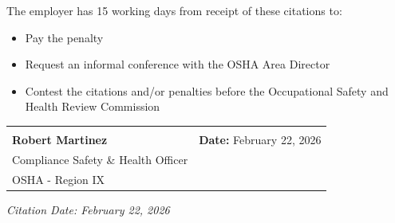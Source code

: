 \documentclass[11pt]{article}
\begin{document}
The employer has 15 working days from receipt of these citations to:
\begin{itemize}
\item Pay the penalty
\item Request an informal conference with the OSHA Area Director
\item Contest the citations and/or penalties before the Occupational Safety and Health Review Commission
\end{itemize}

\vspace{2em}

\begin{tabular}{@{}p{7cm}p{7cm}@{}}
\hrulefill & \\
\textbf{Robert Martinez} & \textbf{Date:} February 22, 2026 \\
Compliance Safety \& Health Officer & \\
OSHA - Region IX & \\
\end{tabular}

\vspace{1em}
\begin{center}
\small\textit{Citation Date: February 22, 2026}
\end{center}
\end{document}
